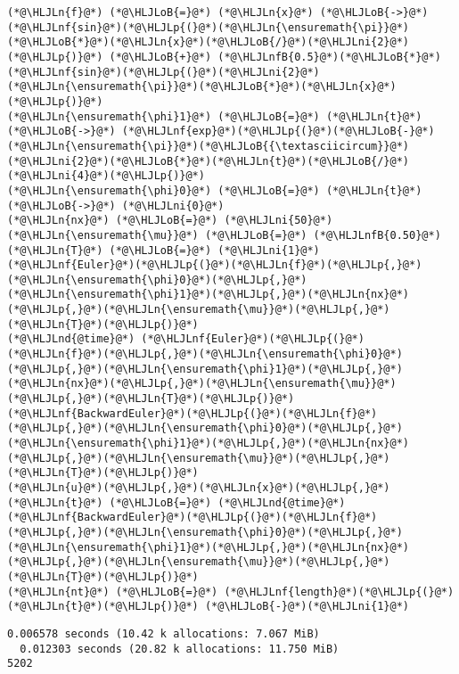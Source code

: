 \documentclass[12pt,landscape]{article}
\newcommand{\HLJLn}[1]{#1}
\newcommand{\HLJLnd}[1]{\textcolor[RGB]{214,102,97}{#1}}
\newcommand{\HLJLnf}[1]{\textcolor[RGB]{66,102,213}{#1}}
\newcommand{\HLJLnfB}[1]{\textcolor[RGB]{59,151,46}{#1}}
\newcommand{\HLJLni}[1]{\textcolor[RGB]{59,151,46}{#1}}
\newcommand{\HLJLoB}[1]{\textcolor[RGB]{102,102,102}{\textbf{#1}}}
\newcommand{\HLJLp}[1]{#1}
\begin{document}
{\begin{lstlisting}
(*@\HLJLn{f}@*) (*@\HLJLoB{=}@*) (*@\HLJLn{x}@*) (*@\HLJLoB{->}@*) (*@\HLJLnf{sin}@*)(*@\HLJLp{(}@*)(*@\HLJLn{\ensuremath{\pi}}@*)(*@\HLJLoB{*}@*)(*@\HLJLn{x}@*)(*@\HLJLoB{/}@*)(*@\HLJLni{2}@*)(*@\HLJLp{)}@*) (*@\HLJLoB{+}@*) (*@\HLJLnfB{0.5}@*)(*@\HLJLoB{*}@*)(*@\HLJLnf{sin}@*)(*@\HLJLp{(}@*)(*@\HLJLni{2}@*)(*@\HLJLn{\ensuremath{\pi}}@*)(*@\HLJLoB{*}@*)(*@\HLJLn{x}@*)(*@\HLJLp{)}@*)
(*@\HLJLn{\ensuremath{\phi}1}@*) (*@\HLJLoB{=}@*) (*@\HLJLn{t}@*) (*@\HLJLoB{->}@*) (*@\HLJLnf{exp}@*)(*@\HLJLp{(}@*)(*@\HLJLoB{-}@*)(*@\HLJLn{\ensuremath{\pi}}@*)(*@\HLJLoB{{\textasciicircum}}@*)(*@\HLJLni{2}@*)(*@\HLJLoB{*}@*)(*@\HLJLn{t}@*)(*@\HLJLoB{/}@*)(*@\HLJLni{4}@*)(*@\HLJLp{)}@*)
(*@\HLJLn{\ensuremath{\phi}0}@*) (*@\HLJLoB{=}@*) (*@\HLJLn{t}@*) (*@\HLJLoB{->}@*) (*@\HLJLni{0}@*)
(*@\HLJLn{nx}@*) (*@\HLJLoB{=}@*) (*@\HLJLni{50}@*)
(*@\HLJLn{\ensuremath{\mu}}@*) (*@\HLJLoB{=}@*) (*@\HLJLnfB{0.50}@*)
(*@\HLJLn{T}@*) (*@\HLJLoB{=}@*) (*@\HLJLni{1}@*)
(*@\HLJLnf{Euler}@*)(*@\HLJLp{(}@*)(*@\HLJLn{f}@*)(*@\HLJLp{,}@*)(*@\HLJLn{\ensuremath{\phi}0}@*)(*@\HLJLp{,}@*)(*@\HLJLn{\ensuremath{\phi}1}@*)(*@\HLJLp{,}@*)(*@\HLJLn{nx}@*)(*@\HLJLp{,}@*)(*@\HLJLn{\ensuremath{\mu}}@*)(*@\HLJLp{,}@*)(*@\HLJLn{T}@*)(*@\HLJLp{)}@*)
(*@\HLJLnd{@time}@*) (*@\HLJLnf{Euler}@*)(*@\HLJLp{(}@*)(*@\HLJLn{f}@*)(*@\HLJLp{,}@*)(*@\HLJLn{\ensuremath{\phi}0}@*)(*@\HLJLp{,}@*)(*@\HLJLn{\ensuremath{\phi}1}@*)(*@\HLJLp{,}@*)(*@\HLJLn{nx}@*)(*@\HLJLp{,}@*)(*@\HLJLn{\ensuremath{\mu}}@*)(*@\HLJLp{,}@*)(*@\HLJLn{T}@*)(*@\HLJLp{)}@*)
(*@\HLJLnf{BackwardEuler}@*)(*@\HLJLp{(}@*)(*@\HLJLn{f}@*)(*@\HLJLp{,}@*)(*@\HLJLn{\ensuremath{\phi}0}@*)(*@\HLJLp{,}@*)(*@\HLJLn{\ensuremath{\phi}1}@*)(*@\HLJLp{,}@*)(*@\HLJLn{nx}@*)(*@\HLJLp{,}@*)(*@\HLJLn{\ensuremath{\mu}}@*)(*@\HLJLp{,}@*)(*@\HLJLn{T}@*)(*@\HLJLp{)}@*)
(*@\HLJLn{u}@*)(*@\HLJLp{,}@*)(*@\HLJLn{x}@*)(*@\HLJLp{,}@*)(*@\HLJLn{t}@*) (*@\HLJLoB{=}@*) (*@\HLJLnd{@time}@*) (*@\HLJLnf{BackwardEuler}@*)(*@\HLJLp{(}@*)(*@\HLJLn{f}@*)(*@\HLJLp{,}@*)(*@\HLJLn{\ensuremath{\phi}0}@*)(*@\HLJLp{,}@*)(*@\HLJLn{\ensuremath{\phi}1}@*)(*@\HLJLp{,}@*)(*@\HLJLn{nx}@*)(*@\HLJLp{,}@*)(*@\HLJLn{\ensuremath{\mu}}@*)(*@\HLJLp{,}@*)(*@\HLJLn{T}@*)(*@\HLJLp{)}@*)
(*@\HLJLn{nt}@*) (*@\HLJLoB{=}@*) (*@\HLJLnf{length}@*)(*@\HLJLp{(}@*)(*@\HLJLn{t}@*)(*@\HLJLp{)}@*) (*@\HLJLoB{-}@*)(*@\HLJLni{1}@*)
\end{lstlisting}

\begin{lstlisting}
0.006578 seconds (10.42 k allocations: 7.067 MiB)
  0.012303 seconds (20.82 k allocations: 11.750 MiB)
5202
\end{lstlisting}


}
\end{document}
